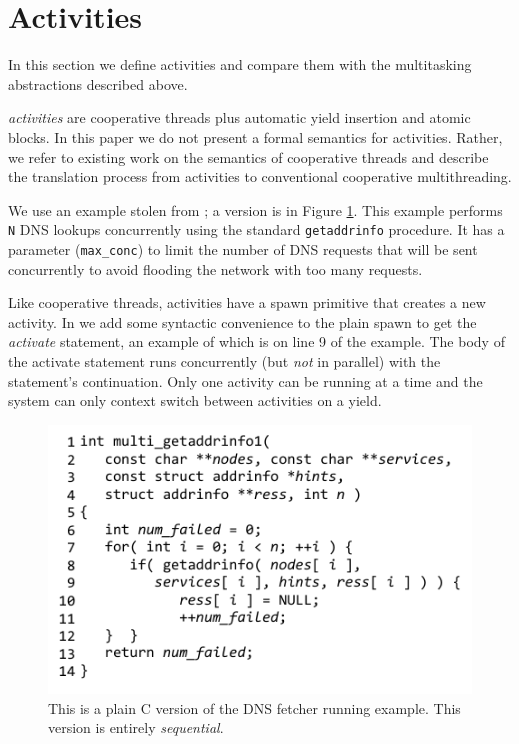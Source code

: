 \documentclass[preprint, 10pt, numbers]{sigplanconf}
\begin{document}


\section{Activities}

In this section we define activities and compare them with the multitasking abstractions described above.

\emph{activities} are cooperative threads plus automatic yield insertion and atomic blocks.
In this paper we do not present a formal semantics for activities.
Rather, we refer to existing work on the semantics of cooperative threads \cite{Abadi2009} and describe the translation process from activities to conventional cooperative multithreading.

We use an example stolen from \cite{Krohn2007}; a \charcoal{} version is in Figure \ref{fig:charcoal_multidns_seq}.
This example performs \texttt{N} DNS lookups concurrently using the standard \texttt{getaddrinfo} procedure.
It has a parameter (\texttt{max\_conc}) to limit the number of DNS requests that will be sent concurrently to avoid flooding the network with too many requests.

Like cooperative threads, activities have a spawn primitive that creates a new activity.
In \charcoal{} we add some syntactic convenience to the plain spawn to get the \emph{activate} statement, an example of which is on line 9 of the example.
The body of the activate statement runs concurrently (but \emph{not} in parallel) with the statement's continuation.
Only one activity can be running at a time and the system can only context switch between activities on a yield.

\begin{figure}
\includegraphics{multi_getaddrinfo_seq}
\caption{This is a plain C version of the DNS fetcher running example.
  This version is entirely \emph{sequential}.}
\label{fig:charcoal_multidns_seq}
\end{figure}
\end{document}
